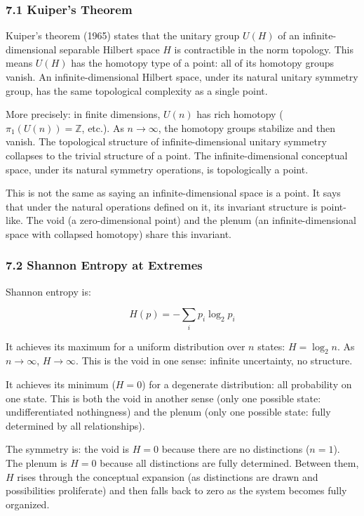 \documentclass[
  11pt,
  letterpaper,
]{article}
\begin{document}
\subsubsection{7.1 Kuiper's Theorem}\label{kuipers-theorem}

Kuiper's theorem (1965) states that the unitary group \(U(H)\) of an
infinite-dimensional separable Hilbert space \(H\) is contractible in
the norm topology. This means \(U(H)\) has the homotopy type of a point:
all of its homotopy groups vanish. An infinite-dimensional Hilbert
space, under its natural unitary symmetry group, has the same
topological complexity as a single point.

More precisely: in finite dimensions, \(U(n)\) has rich homotopy
(\(\pi_1(U(n)) = \mathbb{Z}\), etc.). As \(n \to \infty\), the homotopy
groups stabilize and then vanish. The topological structure of
infinite-dimensional unitary symmetry collapses to the trivial structure
of a point. The infinite-dimensional conceptual space, under its natural
symmetry operations, is topologically a point.

This is not the same as saying an infinite-dimensional space is a point.
It says that under the natural operations defined on it, its invariant
structure is point-like. The void (a zero-dimensional point) and the
plenum (an infinite-dimensional space with collapsed homotopy) share
this invariant.

\subsubsection{7.2 Shannon Entropy at
Extremes}\label{shannon-entropy-at-extremes}

Shannon entropy is:

\[H(p) = -\sum_{i} p_i \log_2 p_i\]

It achieves its maximum for a uniform distribution over \(n\) states:
\(H = \log_2 n\). As \(n \to \infty\), \(H \to \infty\). This is the
void in one sense: infinite uncertainty, no structure.

It achieves its minimum (\(H = 0\)) for a degenerate distribution: all
probability on one state. This is both the void in another sense (only
one possible state: undifferentiated nothingness) and the plenum (only
one possible state: fully determined by all relationships).

The symmetry is: the void is \(H = 0\) because there are no distinctions
(\(n = 1\)). The plenum is \(H = 0\) because all distinctions are fully
determined. Between them, \(H\) rises through the conceptual expansion
(as distinctions are drawn and possibilities proliferate) and then falls
back to zero as the system becomes fully organized.
\end{document}
